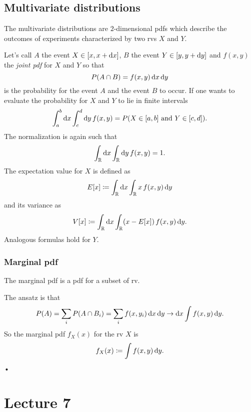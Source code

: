 \documentclass[
	10pt,
	draft
]{scrreprt}
\begin{document}
		\section{Multivariate distributions}

The multivariate distributions are $2$-dimensional \acp{pdf} which describe the outcomes of experiments characterized by two \acp{rv} $X$ and $Y$.

Let's call $A$ the event $X\in[x,x + \mathop{}\!\mathrm{d} x]$, $B$ the event $Y \in [y,y+\mathop{}\!\mathrm{d} y]$ and $f(x,y)$ the \emph{joint \ac{pdf}} for $X$ and $Y$ so that
\begin{equation}
P(A\cap B) = f(x,y)\mathop{}\!\mathrm{d} x\mathop{}\!\mathrm{d} y
\end{equation}
is the probability for the event $A$ and the event $B$ to occur.
If one wants to evaluate the probability for $X$ and $Y$ to lie in finite intervals
\begin{equation}
\int_a^b\mathop{}\!\mathrm{d} x\int_c^d\mathop{}\!\mathrm{d} y\,f(x,y) = P(X\in[a,b]\text{ and }Y \in [c,d]).
\end{equation}
The normalization is again such that
\begin{equation}
\int_{\mathbb{R}}\mathop{}\!\mathrm{d} x\int_{\mathbb{R}}\mathop{}\!\mathrm{d} y\,f(x,y) = 1.
\end{equation}
The expectation value for $X$ is defined as
\begin{equation}
E[x] \coloneqq \int_{\mathbb{R}}\mathop{}\!\mathrm{d} x\int_{\mathbb{R}} x\,f(x,y)\mathop{}\!\mathrm{d} y
\end{equation}
and its variance as
\begin{equation}
V[x]\coloneqq \int_{\mathbb{R}}\mathop{}\!\mathrm{d} x\int_{\mathbb{R}} (x-E[x])\,f(x,y)\mathop{}\!\mathrm{d} y.
\end{equation}
Analogous formulas hold for $Y$.

			\subsection{Marginal \acs{pdf}}

The marginal \ac{pdf} is a \ac{pdf} for a  subset of \acs{rv}.


The ansatz is that
\begin{equation}
P(A) = \sum_i P(A\cap B_i)
= \sum_i f(x,y_i) \mathop{}\!\mathrm{d} x \mathop{}\!\mathrm{d} y\to
\mathop{}\!\mathrm{d} x\int f(x,y)\mathop{}\!\mathrm{d} y.
\end{equation}
So the marginal \ac{pdf} $f_X(x)$ for the \ac{rv} $X$ is
\begin{equation}
f_X(x) \coloneqq \int f(x,y)\mathop{}\!\mathrm{d} y.
\end{equation}•


	\chapter{Lecture 7}
\end{document}
